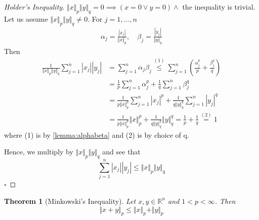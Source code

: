 \documentclass[11pt, oneside]{book}
\theoremstyle{break}
\newtheorem{thm}{Theorem}[section]
\newtheorem*{proof}{Proof}
\newcommand{\bb}[1]{\mathbb{#1}}			%
\newcommand{\qed}{\hfill\ensuremath{\square}}	%
\begin{document}
\begin{proof}[Holder's Inequality]
	$\Vert x\Vert _p \Vert y\Vert _q = 0 \implies (x = 0 \lor y = 0) \land $ the inequality is trivial. Let us assume $\Vert x\Vert _p \Vert y\Vert _q \neq 0$. For $j = 1, ..., n$
	\begin{gather*}
		\alpha_j = \frac{|x_j|}{\Vert x\Vert _p}, \quad \beta_j = \frac{|y_j|}{\Vert y\Vert _q}
	\end{gather*}
	Then
	\begin{align*}
		\frac{1}{\Vert x\Vert _p \Vert y\Vert _q} \sum_{j=1}^{n} |x_j||y_j| &= \sum_{j=1}^{n} \alpha_j \beta_j \overset{(1)}{\leq} \sum_{j=1}^{n} \left( \frac{\alpha_j^p}{p} + \frac{\beta_j^q}{q} \right) \\
		&= \frac{1}{p} \sum_{j=1}^{n} \alpha_j^p + \frac{1}{q} \sum_{j=1}^{n} \beta_j^q \\
		&= \frac{1}{p\Vert x\Vert _p^p} \sum_{j=1}^{n} |x_j|^p + \frac{1}{q \Vert y\Vert _q^q} \sum_{j=1}^{n} |y_j|^q \\
		&= \frac{1}{p \Vert x\Vert _p^p} \Vert x\Vert _p^p + \frac{1}{q \Vert y\Vert _q^q} \Vert y\Vert _q^q = \frac{1}{p} + \frac{1}{q} \overset{(2)}{=} 1
	\end{align*}
	where (1) is by \autoref{lemma:alphabeta} and (2) is by choice of q.

	Hence, we multiply by $\Vert x\Vert _p \Vert y\Vert _q$ and see that
	\begin{equation}
		\sum_{j=1}^{n} |x_j||y_j| \leq \Vert x\Vert _p \Vert y\Vert _q
	\end{equation}\qed
\end{proof}

\begin{thm}[Minkowski's Inequality]\label{thm:minkowski}
	Let $x, y \in \bb{R}^n$ and $1 < p < \infty$. Then
	\begin{equation}
		\Vert x + y\Vert_p  \leq \Vert x\Vert _p + \Vert y\Vert _p
	\end{equation}
\end{thm}
\end{document}
